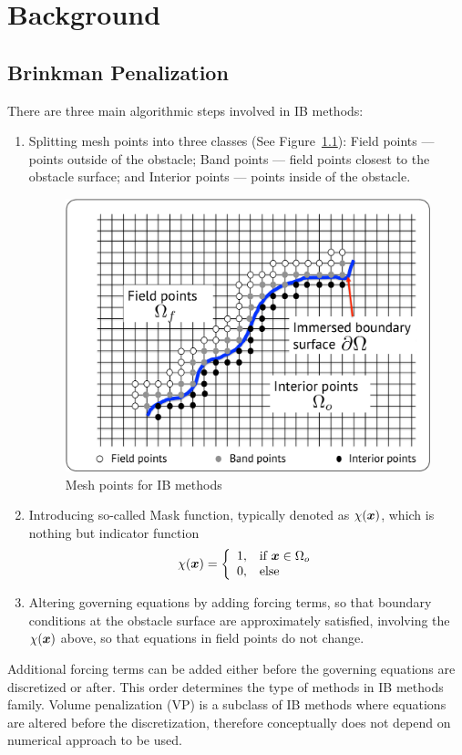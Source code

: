 \chapter{Background}
\label{chapter:2}
\section{Brinkman Penalization}
There are three main algorithmic steps involved in IB methods:
\begin{enumerate}
\item
Splitting mesh points into three classes (See Figure~\ref{fig:ib_mesh}): Field points --- points outside of the obstacle; Band points --- field points closest to the obstacle surface; and Interior points --- points inside of the obstacle.
\begin{figure}[h!]
\centering \includegraphics[scale=0.5]{fig/ib.pdf}
\caption{Mesh points for IB methods} \label{fig:ib_mesh}
\end{figure}
\item
Introducing so-called Mask function, typically denoted as $\chi(\boldsymbol{x})$, which is nothing but indicator function
\begin{align*}
\chi(\boldsymbol{x}) = \left\{\begin{array}{cl}
1, & \textmd{if } \boldsymbol{x} \in \Omega_o \\
0, & \textmd{else}
\end{array}\right.
\end{align*}
\item
Altering governing equations by adding forcing terms, so that boundary conditions at the obstacle surface are approximately satisfied, involving the $\chi(\boldsymbol{x})$ above, so that equations in field points do not change.
\end{enumerate}
Additional forcing terms can be added either before the governing equations are discretized or after. This order determines the type of methods in IB methods family. Volume penalization (VP) is a subclass of IB methods where equations are altered before the discretization, therefore conceptually does not depend on numerical approach to be used.

